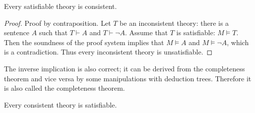 \begin{page}
\setcounter{section}{3}
\setcounter{subsection}{2}
\setcounter{dfn}{20}
\label{portion:718}

\begin{lem}
\label{lem:SatConsist}
Every satisfiable theory is consistent.
\end{lem}

\end{page}

\begin{page}
\setcounter{section}{3}
\setcounter{subsection}{2}
\setcounter{dfn}{20}
\label{portion:719}

\begin{proof}
Proof by contraposition.
Let $T$ be an inconsistent theory: there is a sentence $A$ such that $T \vdash A$ and $T \vdash \neg A$.
Assume that $T$ is satisfiable: $M \vDash T$.
Then the soundness of the proof system implies that $M \vDash A$ and $M \vDash \neg A$, which is a contradiction.
Thus every inconsistent theory is unsatisfiable.
\end{proof}

The inverse implication is also correct; it can be derived from the completeness theorem and vice versa by some manipulations with deduction trees.
Therefore it is also called the completeness theorem.


\end{page}

\begin{page}
\setcounter{section}{3}
\setcounter{subsection}{2}
\setcounter{dfn}{21}
\label{portion:721}

\begin{thm}
\label{thm:Complete2}
Every consistent theory is satisfiable.
\end{thm}

\end{page}

\begin{page}
\setcounter{section}{3}
\setcounter{subsection}{2}
\setcounter{dfn}{21}
\label{portion:722}

% 

\end{page}

\begin{page}
\setcounter{section}{3}
\setcounter{subsection}{2}
\setcounter{dfn}{22}
\label{portion:724}


\end{page}

